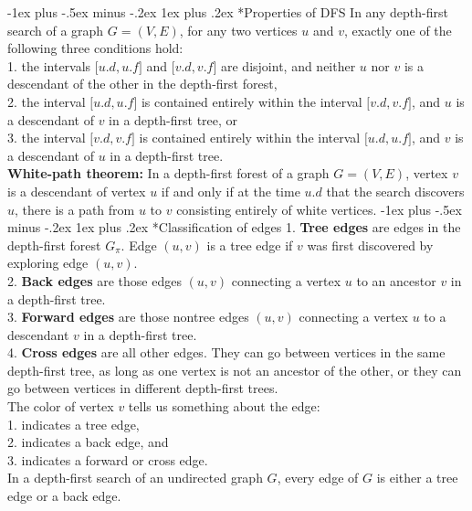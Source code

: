 \documentclass[10pt,landscape]{article}
\makeatletter
\renewcommand{\subsubsection}{\@startsection{subsubsection}{3}{0mm}%
                                {-1ex plus -.5ex minus -.2ex}%
                                {1ex plus .2ex}%
                                {\normalfont\small\bfseries}}
\makeatother
\begin{document}
\begin{multicols}{3}
\subsubsection*{Properties of DFS}
\scriptsize{
In any depth-first search of a graph $G=(V,E)$, for any two vertices $u$ and $v$, exactly one of the following three conditions hold:\\
1. the intervals $\lbrack u.d, u.f\rbrack$ and $\lbrack v.d,v.f\rbrack$ are disjoint, and neither $u$ nor $v$ is a descendant of the other in the depth-first forest,\\
2. the interval $\lbrack u.d, u.f\rbrack$ is contained entirely within the interval $\lbrack v.d, v.f\rbrack$, and $u$ is a descendant of $v$ in a depth-first tree, or\\
3. the interval $\lbrack v.d, v.f\rbrack$ is contained entirely within the interval $\lbrack u.d, u.f\rbrack$, and $v$ is a descendant of $u$ in a depth-first tree.\\
\textbf{White-path theorem:} In a depth-first forest of a graph $G = (V, E)$, vertex $v$ is a descendant of vertex $u$ if and only if at the time $u.d$ that the search discovers $u$, there is a path from $u$ to $v$ consisting entirely of white vertices.
}
\subsubsection*{Classification of edges}
\scriptsize{
1. \textbf{Tree edges} are edges in the depth-first forest $G_\pi$. Edge $(u, v)$ is a tree edge if $v$ was first discovered by exploring edge $(u, v)$.\\
2. \textbf{Back edges} are those edges $(u, v)$ connecting a vertex $u$ to an ancestor $v$ in a depth-first tree.\\
3. \textbf{Forward edges} are those nontree edges $(u,v)$ connecting a vertex $u$ to a descendant $v$ in a depth-first tree.\\
4. \textbf{Cross edges} are all other edges. They can go between vertices in the same depth-first tree, as long as one vertex is not an ancestor of the other, or they can go between vertices in different depth-first trees.\\
The color of vertex $v$ tells us something about the edge:\\
1.  indicates a tree edge, \\
2.  indicates a back edge, and \\
3.  indicates a forward or cross edge.\\
In a depth-first search of an undirected graph $G$, every edge of $G$ is either a tree edge or a back edge.
}

\end{multicols}
\end{document}
